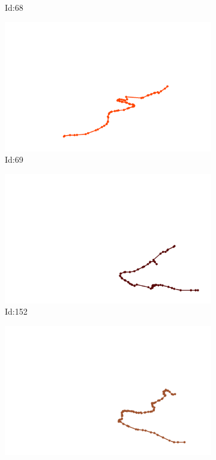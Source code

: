 \documentclass[12pt,twoside]{report}
\begin{document}
\begin{figure}
\begin{subfigure}[b]{0.20\textwidth}
\caption{Id:68}
\end{subfigure}
\begin{subfigure}[b]{0.20\textwidth}
\centering
\includegraphics[width=\textwidth]{../trajectories/69.png}
\caption{Id:69}
\end{subfigure}
\begin{subfigure}[b]{0.20\textwidth}
\centering
\includegraphics[width=\textwidth]{../trajectories/152.png}
\caption{Id:152}
\end{subfigure}
\begin{subfigure}[b]{0.20\textwidth}
\centering
\includegraphics[width=\textwidth]{../trajectories/170.png}

\end{subfigure}
\end{figure}
\end{document}
